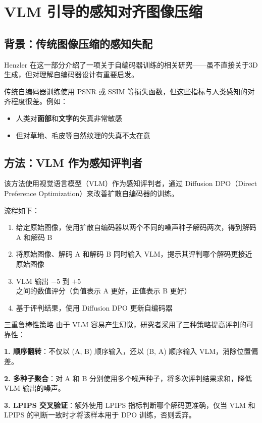 \section{VLM 引导的感知对齐图像压缩}

\subsection{背景：传统图像压缩的感知失配}

Henzler 在这一部分介绍了一项关于自编码器训练的相关研究——虽不直接关于3D生成，但对理解自编码器设计有重要启发。

传统自编码器训练使用 PSNR 或 SSIM 等损失函数，但这些指标与人类感知的对齐程度很差。例如：

\begin{itemize}
    \item 人类对\textbf{面部}和\textbf{文字}的失真非常敏感
    \item 但对草地、毛皮等自然纹理的失真不太在意
\end{itemize}

\subsection{方法：VLM 作为感知评判者}

该方法使用视觉语言模型（VLM）作为感知评判者，通过 Diffusion DPO（Direct Preference Optimization）来改善扩散自编码器的训练。

流程如下：

\begin{enumerate}
    \item 给定原始图像，使用扩散自编码器以两个不同的噪声种子解码两次，得到解码 A 和解码 B
    \item 将原始图像、解码 A 和解码 B 同时输入 VLM，提示其评判哪个解码更接近原始图像
    \item VLM 输出 $-5$ 到 $+5$ 之间的数值评分（负值表示 A 更好，正值表示 B 更好）
    \item 基于评判结果，使用 Diffusion DPO 更新自编码器
\end{enumerate}

\begin{importantbox}{三重鲁棒性策略}
由于 VLM 容易产生幻觉，研究者采用了三种策略提高评判的可靠性：

\textbf{1. 顺序翻转}：不仅以 (A, B) 顺序输入，还以 (B, A) 顺序输入 VLM，消除位置偏差。

\textbf{2. 多种子聚合}：对 A 和 B 分别使用多个噪声种子，将多次评判结果求和，降低 VLM 输出的噪声。

\textbf{3. LPIPS 交叉验证}：额外使用 LPIPS 指标判断哪个解码更准确，仅当 VLM 和 LPIPS 的判断一致时才将该样本用于 DPO 训练，否则丢弃。
\end{importantbox}

